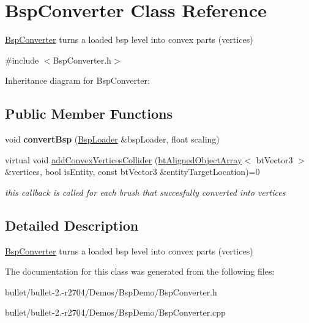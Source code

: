 \hypertarget{class_bsp_converter}{\section{Bsp\+Converter Class Reference}
\label{class_bsp_converter}
}


\hyperlink{class_bsp_converter}{Bsp\+Converter} turns a loaded bsp level into convex parts (vertices)  




{\ttfamily \#include $<$Bsp\+Converter.\+h$>$}



Inheritance diagram for Bsp\+Converter\+:
\subsection*{Public Member Functions}
\begin{DoxyCompactItemize}
\item 
\hypertarget{class_bsp_converter_ac83c5f65049a4feba9fbd4202760ec09}{void {\bfseries convert\+Bsp} (\hyperlink{class_bsp_loader}{Bsp\+Loader} \&bsp\+Loader, float scaling)}\label{class_bsp_converter_ac83c5f65049a4feba9fbd4202760ec09}

\item 
\hypertarget{class_bsp_converter_aabeb6a23e530b64ca9e87c9367169331}{virtual void \hyperlink{class_bsp_converter_aabeb6a23e530b64ca9e87c9367169331}{add\+Convex\+Vertices\+Collider} (\hyperlink{classbt_aligned_object_array}{bt\+Aligned\+Object\+Array}$<$ bt\+Vector3 $>$ \&vertices, bool is\+Entity, const bt\+Vector3 \&entity\+Target\+Location)=0}\label{class_bsp_converter_aabeb6a23e530b64ca9e87c9367169331}

\begin{DoxyCompactList}\small\item\em this callback is called for each brush that succesfully converted into vertices \end{DoxyCompactList}\end{DoxyCompactItemize}


\subsection{Detailed Description}
\hyperlink{class_bsp_converter}{Bsp\+Converter} turns a loaded bsp level into convex parts (vertices) 

The documentation for this class was generated from the following files\+:\begin{DoxyCompactItemize}
\item 
bullet/bullet-\/2.-\/r2704/\+Demos/\+Bsp\+Demo/Bsp\+Converter.\+h\item 
bullet/bullet-\/2.-\/r2704/\+Demos/\+Bsp\+Demo/Bsp\+Converter.\+cpp\end{DoxyCompactItemize}

